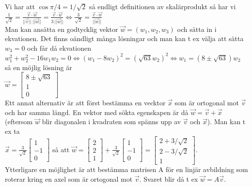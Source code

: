 Vi har att $\cos\pi/4=1/\sqrt{2}$ så endligt definitionen av skalärprodukt så har vi\\
$\frac{1}{\sqrt{2}}=\frac{\vec{v}\cdot\vec{w}}{||\vec{v}||\ ||\vec{w}||}=\frac{\vec{v}\cdot\vec{w}}{3\ ||\vec{w}||}\iff\frac{3}{\sqrt{2}}=\frac{\vec{v}\cdot\vec{w}}{||\vec{w}||}$\\
Man kan ansätta en godtycklig vektor $\vec{w}=(w_1, w_2, w_3)$ och sätta in i ekvationen. Det finns oändligt många lösningar och man kan t ex välja att sätta $w_3=0$ och får då ekvationen\\
$w_1^2+w_2^2-16w_1w_2=0\iff(w_1-8w_2)^2=(\sqrt{63}w_2)^2\iff w_1=(8\pm\sqrt{63})w_2$\\
så en möjlig lösning är\\
$\vec{w}=\begin{bmatrix}8\pm\sqrt{63}\\1\\0\end{bmatrix}$\\
Ett annat alternativ är att först bestämma en vecktor $\vec{x}$ som är ortogonal mot $\vec{v}$ och har samma längd. En vektor med sökta egenskapen är då $\vec{w}=\vec{v}+\vec{x}$ (eftersom $\vec{w}$ blir diagonalen i kvadraten som spänns upp av $\vec{v}$ och $\vec{x}$). Man kan t ex ta\\
$\vec{x}=\frac{3}{\sqrt{2}}\begin{bmatrix}1\\-1\\0\end{bmatrix}$ så att $\vec{w}=\begin{bmatrix}2\\2\\1\end{bmatrix}+\frac{3}{\sqrt{2}}\begin{bmatrix}1\\-1\\0\end{bmatrix}=\begin{bmatrix}2+3/\sqrt{2}\\2-3/\sqrt{2}\\1\end{bmatrix}$.\\
Ytterligare en möjlighet är att bestämma matrisen A för en linjär avbildning som roterar kring en axel som är ortogonal mot $\vec{v}$. Svaret blir då t ex $\vec{w}=A\vec{v}$.
